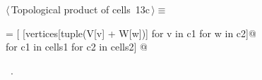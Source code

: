 \documentclass[11pt,oneside]{article}	%
\begin{document}
\begin{flushleft} \small
\begin{minipage}{\linewidth} \label{scrap20}
\protect{}$\langle\,$Topological product of cells\nobreak\ {\footnotesize 13c}$\,\rangle\equiv$
\vspace{-1ex}
\begin{list}{}{} \item
\mbox{}\verb@cells = [ [vertices[tuple(V[v] + W[w])] for v in c1 for w in c2]@\\
\mbox{}\verb@         for c1 in cells1 for c2 in cells2]  @{\NWsep}
\end{list}
\vspace{-1ex}
\footnotesize\addtolength{\baselineskip}{-1ex}
\begin{list}{}{\setlength{\itemsep}{-\parsep}\setlength{\itemindent}{-\leftmargin}}
\item \NWtxtMacroRefIn\ .
\end{list}
\end{minipage}\\[4ex]
\end{flushleft}
\end{document}
